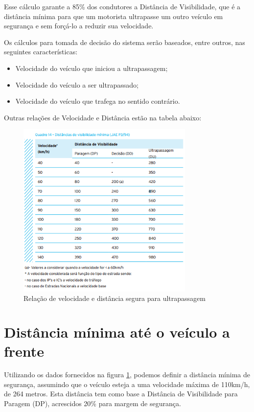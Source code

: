 Esse cálculo garante a 85\% dos condutores a Distância de Visibilidade, que é a distância mínima para que um motorista ultrapasse um outro veículo em segurança e sem forçá-lo a reduzir sua velocidade. \cite{costa}

Os cálculos para tomada de decisão do sistema serão baseados, entre outros, nas seguintes características:

\begin{itemize}
  \item Velocidade do veículo que iniciou a ultrapassagem;
  \item Velocidade do veículo a ser ultrapassado;
  \item Velocidade do veículo que trafega no sentido contrário.
\end{itemize}

Outras relações de Velocidade e Distância estão na tabela abaixo:
\begin{figure}[h]
  \centering
  \includegraphics[width=330px, scale=0.5]{figuras/visibilidade}
  \caption{Relação de velocidade e distância segura para ultrapassagem}
  \label{fig:visibilidade}
\end{figure}

\section{Distância mínima até o veículo a frente}
Utilizando os dados fornecidos na figura \ref{fig:visibilidade}, podemos definir a distância mínima de segurança, assumindo que o veículo esteja a uma velocidade máxima de 110km/h, de 264 metros. Esta distância tem como base a Distância de Visibilidade para Paragem (DP), acrescidos 20\% para margem de segurança.

